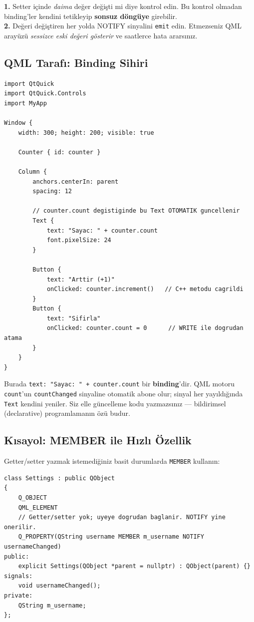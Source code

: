 \documentclass[11pt,a4paper]{article}
\newcommand{\kod}[1]{\texttt{\color{koyuGri}#1}}
\begin{document}
\begin{uyarikutu}
\textbf{1.} Setter içinde \emph{daima} değer değişti mi diye kontrol edin. Bu
kontrol olmadan binding'ler kendini tetikleyip \textbf{sonsuz döngüye} girebilir.\\
\textbf{2.} Değeri değiştiren her yolda NOTIFY sinyalini \kod{emit} edin. Etmezseniz
QML arayüzü \emph{sessizce eski değeri gösterir} ve saatlerce hata ararsınız.
\end{uyarikutu}

\subsection{QML Tarafı: Binding Sihiri}

\begin{lstlisting}[style=qmlstyle]
import QtQuick
import QtQuick.Controls
import MyApp

Window {
    width: 300; height: 200; visible: true

    Counter { id: counter }

    Column {
        anchors.centerIn: parent
        spacing: 12

        // counter.count degistiginde bu Text OTOMATIK guncellenir
        Text {
            text: "Sayac: " + counter.count
            font.pixelSize: 24
        }

        Button {
            text: "Arttir (+1)"
            onClicked: counter.increment()   // C++ metodu cagrildi
        }
        Button {
            text: "Sifirla"
            onClicked: counter.count = 0      // WRITE ile dogrudan atama
        }
    }
}
\end{lstlisting}

\begin{ipucukutu}
Burada \kod{text: "Sayac: " + counter.count} bir \textbf{binding}'dir. QML motoru
\kod{count}'un \kod{countChanged} sinyaline otomatik abone olur; sinyal her
yayıldığında \kod{Text} kendini yeniler. Siz elle güncelleme kodu yazmazsınız —
bildirimsel (declarative) programlamanın özü budur.
\end{ipucukutu}

\subsection{Kısayol: MEMBER ile Hızlı Özellik}

Getter/setter yazmak istemediğiniz basit durumlarda \kod{MEMBER} kullanın:

\begin{lstlisting}
class Settings : public QObject
{
    Q_OBJECT
    QML_ELEMENT
    // Getter/setter yok; uyeye dogrudan baglanir. NOTIFY yine onerilir.
    Q_PROPERTY(QString username MEMBER m_username NOTIFY usernameChanged)
public:
    explicit Settings(QObject *parent = nullptr) : QObject(parent) {}
signals:
    void usernameChanged();
private:
    QString m_username;
};
\end{lstlisting}
\end{document}

